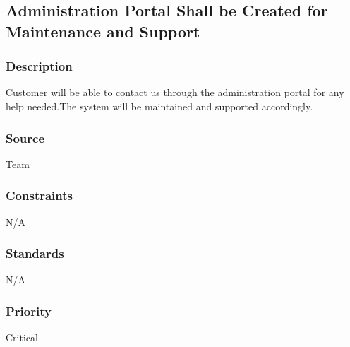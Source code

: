 
\subsection{Administration Portal Shall be Created for Maintenance and  Support }
\subsubsection{Description}
Customer will be able to contact us through the administration portal for any help needed.The system will be maintained and supported accordingly. 
\subsubsection{Source}
Team
\subsubsection{Constraints}
N/A
\subsubsection{Standards}
N/A
\subsubsection{Priority}
Critical